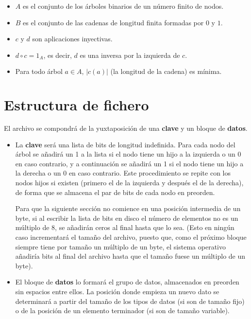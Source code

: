\documentclass{article}
\begin{document}
\begin{itemize}
	\item $A$ es el conjunto de los árboles binarios de un número finito de nodos.
	\item $B$ es el conjunto de las cadenas de longitud finita formadas por $0$ y
	$1$.
	\item $c$ y $d$ son aplicaciones inyectivas.
	\item $d \circ c = 1_A$, es decir, $d$ es una inversa por la izquierda de $c$.
	\item Para todo árbol $a \in A$, $|c(a)|$ (la longitud de la cadena) es mínima.
\end{itemize}

\section{Estructura de fichero}

El archivo se compondrá de la yuxtaposición de una \textbf{clave} y un
bloque de \textbf{datos}.

\begin{itemize}
	\item La \textbf{clave} será una lista de bits de longitud indefinida.
  Para cada nodo del árbol se añadirá un 1 a la lista si el nodo tiene un hijo a
  la izquierda o un 0 en caso contrario, y a continuación se añadirá un 1 si el
  nodo tiene un hijo a la derecha o un 0 en caso contrario. Este procedimiento
  se repite con los nodos hijos si existen (primero el de la izquierda y después
  el de la derecha), de forma que se almacena el par de bits de cada nodo en preorden.

  Para que la siguiente sección no comience en una posición intermedia de un byte,
  si al escribir la lista de bits en disco el número de elementos no es un múltiplo
  de 8, se añadirán ceros al final hasta que lo sea. (Esto en ningún caso
  incrementará el tamaño del archivo, puesto que, como el próximo bloque siempre
  tiene por tamaño un múltiplo de un byte, el sistema operativo añadiría bits al
  final del archivo hasta que el tamaño fuese un múltiplo de un byte).

	\item El bloque de \textbf{datos} lo formará el grupo de datos, almacenados
  en preorden sin espacios entre ellos. La posición donde empieza un nuevo dato
  se determinará a partir del tamaño de los tipos de datos (si son de tamaño fijo)
  o de la posición de un elemento terminador (si son de tamaño variable).
\end{itemize}
\end{document}

